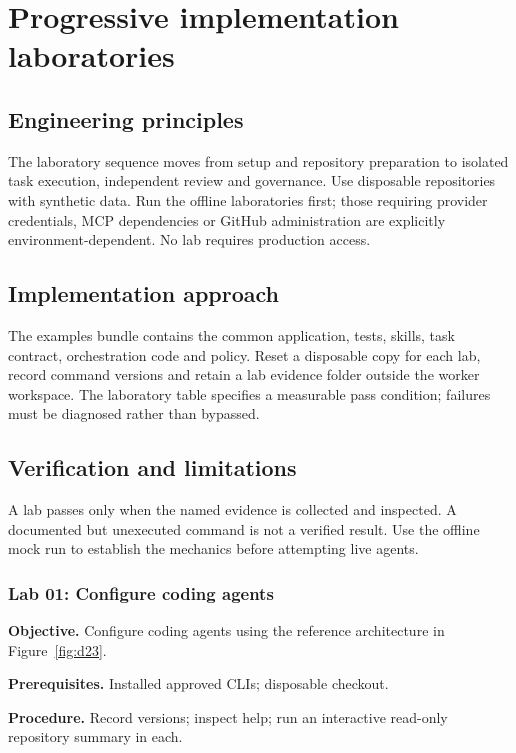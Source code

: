 \chapter{Progressive implementation laboratories}

\section{Engineering principles}

The laboratory sequence moves from setup and repository preparation to isolated task execution, independent review and governance. Use disposable repositories with synthetic data. Run the offline laboratories first; those requiring provider credentials, MCP dependencies or GitHub administration are explicitly environment-dependent. No lab requires production access.

\section{Implementation approach}

The examples bundle contains the common application, tests, skills, task contract, orchestration code and policy. Reset a disposable copy for each lab, record command versions and retain a lab evidence folder outside the worker workspace. The laboratory table specifies a measurable pass condition; failures must be diagnosed rather than bypassed.

\section{Verification and limitations}

A lab passes only when the named evidence is collected and inspected. A documented but unexecuted command is not a verified result. Use the offline mock run to establish the mechanics before attempting live agents.

\subsection{Lab 01: Configure coding agents}

\textbf{Objective.} Configure coding agents using the reference architecture in Figure~\ref{fig:d23}.

\textbf{Prerequisites.} Installed approved CLIs; disposable checkout.

\textbf{Procedure.} Record versions; inspect help; run an interactive read-only repository summary in each.

